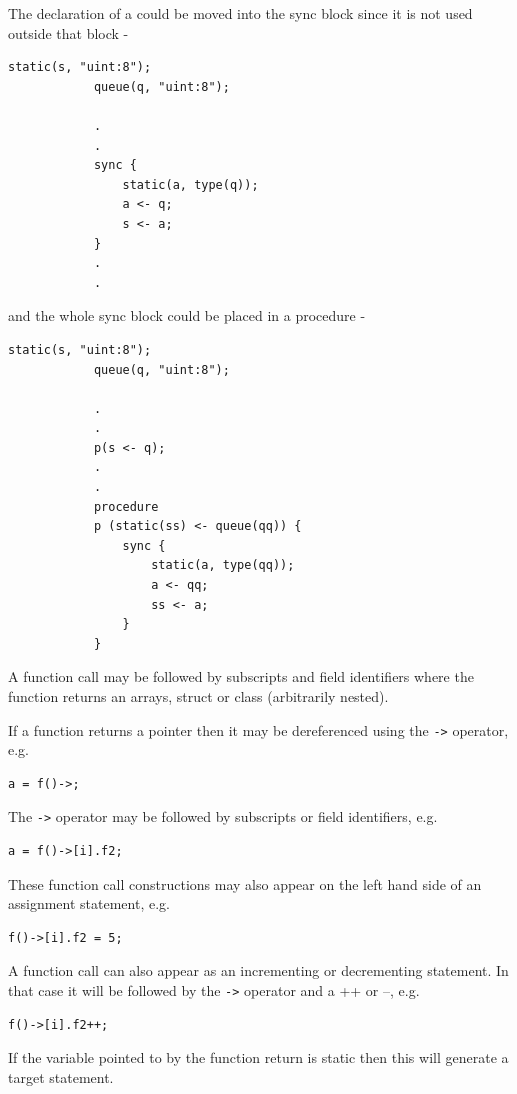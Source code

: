         The declaration of a could be moved into the sync block since
        it is not used outside that block -
       
        \begin{lstlisting}[gobble=8, language=threepl]
            static(s, "uint:8");
            queue(q, "uint:8");
            
            .
            .
            sync {
                static(a, type(q));
                a <- q;
                s <- a;
            }
            .
            .
        \end{lstlisting}
        
        and the whole sync block could be placed in a procedure -
        
        \begin{lstlisting}[gobble=8, language=threepl]
            static(s, "uint:8");
            queue(q, "uint:8");
            
            .
            .
            p(s <- q);
            .
            .
            procedure
            p (static(ss) <- queue(qq)) {
                sync {
                    static(a, type(qq));
                    a <- qq;
                    ss <- a;
                }
            }
        \end{lstlisting}

        
        A function call may be followed by subscripts and field identifiers
        where the function returns an arrays, struct or class (arbitrarily nested).
        
        If a function returns a pointer then it may be dereferenced using
        the \verb'->' operator, e.g.
        \begin{lstlisting}[gobble=8, language=threepl]
           a = f()->;
        \end{lstlisting}
        The \verb'->' operator may be followed by subscripts or field identifiers,
        e.g.
        \begin{lstlisting}[gobble=8, language=threepl]
           a = f()->[i].f2;
        \end{lstlisting}
  
        These function call constructions may also appear on the left hand side
        of an assignment statement, e.g.
        \begin{lstlisting}[gobble=8, language=threepl]
           f()->[i].f2 = 5;
        \end{lstlisting}
        
        A function call can also appear as an incrementing or decrementing
        statement. In that case it will be followed by the \verb'->' operator
        and a ++ or --, e.g.
        \begin{lstlisting}[gobble=8, language=threepl]
           f()->[i].f2++;
        \end{lstlisting}
        If the variable pointed to by the function return is static then
        this will generate a target statement.
        
